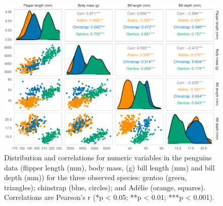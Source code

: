\begin{Schunk}
\begin{figure}
\includegraphics{penguins_files/figure-latex/penguins-pairs-1} \caption[Distribution and correlations for numeric variables in the penguins data (flipper length (mm), body mass, (g) bill length (mm) and bill depth (mm)) for the three observed species]{Distribution and correlations for numeric variables in the penguins data (flipper length (mm), body mass, (g) bill length (mm) and bill depth (mm)) for the three observed species: gentoo (green, triangles); chinstrap (blue, circles); and Adélie (orange, squares). Correlations are Pearson's r (*p < 0.05; **p < 0.01; ***p < 0.001).}\label{fig:penguins-pairs}
\end{figure}
\end{Schunk}

